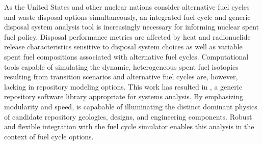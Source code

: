 As the United States and other nuclear nations consider alternative fuel cycles 
and waste disposal options simultaneously, an integrated fuel cycle and generic disposal system 
analysis tool is increasingly necessary for informing nuclear spent 
fuel policy. Disposal performance metrics are affected by heat and radionuclide release 
characteristics sensitive to disposal system choices as well as variable spent 
fuel compositions associated  with alternative fuel cycles.  Computational 
tools capable of simulating the dynamic, heterogeneous spent fuel isotopics 
resulting from transition scenarios and alternative fuel cycles are, however, 
lacking in repository modeling  options.  This work has resulted in \Cyder, a 
generic repository software library appropriate for systems analysis.  By emphasizing 
modularity and speed, \Cyder is capabable of illuminating the distinct dominant 
physics of candidate repository geologies, designs, and engineering components. 
Robust and flexible integration with the \Cyclus fuel cycle simulator
enables this analysis in the context of fuel cycle options.  

\glsresetall
